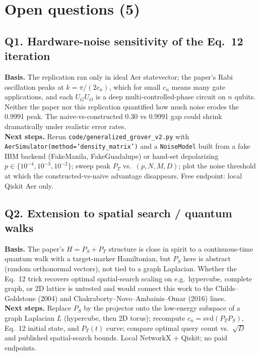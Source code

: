 \section{Open questions (5)}

\subsection*{Q1. Hardware-noise sensitivity of the Eq.~12 iteration}
\textbf{Basis.} The replication ran only in ideal Aer statevector; the paper's
Rabi oscillation peaks at $k = \pi/(2 c_n)$, which for small $c_n$ means many gate
applications, and each $U_G U_O$ is a deep multi-controlled-phase circuit on $n$
qubits. Neither the paper nor this replication quantified how much noise erodes
the 0.9991 peak. The naive-vs-constructed 0.30 vs 0.9991 gap could shrink
dramatically under realistic error rates.\\
\textbf{Next steps.} Rerun \texttt{code/generalized\_grover\_v2.py} with
\texttt{AerSimulator(method='density\_matrix')} and a \texttt{NoiseModel} built
from a fake IBM backend (FakeManila, FakeGuadalupe) or hand-set depolarizing
$p \in \{10^{-4}, 10^{-3}, 10^{-2}\}$; sweep peak $P_T$ vs.\ $(p, N, M, D)$; plot
the noise threshold at which the constructed-vs-naive advantage disappears. Free
endpoint: local Qiskit Aer only.

\subsection*{Q2. Extension to spatial search / quantum walks}
\textbf{Basis.} The paper's $H = P_S + P_T$ structure is close in spirit to a
continuous-time quantum walk with a target-marker Hamiltonian, but $P_S$ here is
abstract (random orthonormal vectors), not tied to a graph Laplacian. Whether the
Eq.~12 trick recovers optimal spatial-search scaling on e.g.\ hypercube, complete
graph, or 2D lattice is untested and would connect this work to the
Childs--Goldstone (2004) and Chakraborty--Novo--Ambainis--Omar (2016) lines.\\
\textbf{Next steps.} Replace $P_S$ by the projector onto the low-energy subspace
of a graph Laplacian $L$ (hypercube, then 2D torus); recompute
$c_n = \mathrm{svd}(P_T P_S)$, Eq.~12 initial state, and $P_T(t)$ curve; compare
optimal query count vs.\ $\sqrt{D}$ and published spatial-search bounds. Local
NetworkX + Qiskit; no paid endpoints.

